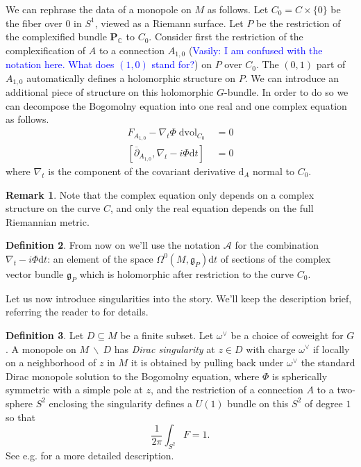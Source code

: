 \documentclass[11pt, oneside, reqno]{amsart}
\theoremstyle{definition} \newtheorem{definition}{Definition}[section]
\theoremstyle{definition} \newtheorem{remark}[definition]{Remark}
\theoremstyle{definition} \newtheorem{remarks}[definition]{Remarks}
\theoremstyle{definition} \newtheorem{question}[definition]{Question}
\theoremstyle{definition} \newtheorem*{note}{Note}
\theoremstyle{definition} \newtheorem{example}[definition]{Example}
\theoremstyle{definition} \newtheorem{examples}[definition]{Examples}
\renewcommand{\gg}{\mathfrak{g}}
\newcommand{\mc}[1]{\mathcal{#1}}
\newcommand{\bo}[1]{\boldsymbol{#1}}
\newcommand{\bs}{\ \backslash \ }
\newcommand{\del}{\partial}
\newcommand{\ol}[1]{\overline{#1}}
\newcommand{\CC}{\mathbb{C}}
\newcommand{\sub}{\subseteq}
\DeclareMathOperator{\dvol}{dvol}
\renewcommand{\d}{\mathrm{d}}
\newcommand{\vasily}[1]{(\textcolor{blue}{Vasily: #1})}
\begin{document}
We can rephrase the data of a monopole on $M$ as follows.  Let $C_0 = C \times \{0\}$ be the fiber over $0$ in $S^1$, viewed as a Riemann surface.  Let $P$ be the restriction of the complexified bundle $\bo P_\CC$ to $C_0$.  Consider first the restriction of the complexification of $A$ to a connection $A_{1,0}$ \vasily{I am confused with the notation here. What does $(1,0)$ stand for?} on $P$ over $C_0$.  The $(0,1)$ part of $A_{1,0}$ automatically defines a holomorphic structure on $P$.  We can introduce an additional piece of structure on this holomorphic $G$-bundle.  In order to do so we can decompose the Bogomolny equation into one real and one complex equation as follows.
\begin{align}
F_{A_{1,0}} - \nabla_t \Phi \dvol_{C_0} &= 0 \label{Bogomolny_equation_real} \\
[\ol{\del}_{A_{1,0}}, \nabla_t - i\Phi \d t] &= 0 \label{Bogomolny_equation_complex}
\end{align}
where $\nabla_t$ is the component of the covariant derivative $\d_A$ normal to $C_0$.  

\begin{remark}
Note that the complex equation only depends on a complex structure on the curve $C$, and only the real equation depends on the full Riemannian metric.
\end{remark}

\begin{definition} 
From now on we'll use the notation $\mc A$ for the combination $\nabla_t - i\Phi \d t$: an element of the space $\Omega^0(M, \gg_P)\d t$ of sections of the complex vector bundle $\gg_P$ which is holomorphic after restriction to the curve $C_0$. 
\end{definition}

Let us now introduce singularities into the story.  We'll keep the description brief, referring the reader to \cite{CharbonneauHurtubise, Smith} for details.
\begin{definition}
Let $D \sub M$ be a finite subset.  Let $\omega^\vee$ be a choice of coweight for $G$.  A monopole on $M \bs D$ has \emph{Dirac singularity} at $z \in D$ with charge $\omega^\vee$ if locally on a neighborhood of $z$ in $M$ it is obtained by pulling back under $\omega^\vee$ the standard Dirac monopole solution to the Bogomolny equation, where $\Phi$ is spherically symmetric with a simple pole at $z$, and the restriction of a connection $A$ to a two-sphere $S^2$ enclosing the singularity defines a $U(1)$ bundle on this $S^2$ of degree $1$ so that
    \[\frac{1}{2\pi} \int_{S^2} F = 1 .\]
  See e.g. \cite[Section 2.2]{CharbonneauHurtubise} for a more detailed description.
\end{definition}
\end{document}
